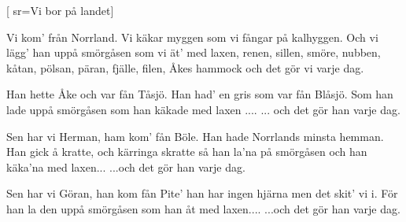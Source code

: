 
[
	sr={Vi bor på landet}]
  
\beginverse*
Vi kom' från Norrland. Vi käkar myggen
som vi fångar på kalhyggen.
Och vi lägg' han uppå smörgåsen
som vi ät' med laxen,
renen,
sillen,
smöre,
nubben,
kåtan,
pölsan,
päran,
fjälle,
filen,
Åkes hammock
och det gör vi varje dag. 
\endverse

\beginverse*
Han hette Åke och var fån Tåsjö.
Han had' en gris som var fån Blåsjö.
Som han lade uppå smörgåsen
som han käkade med laxen ....
... och det gör han varje dag. 
\endverse

\beginverse*
Sen har vi Herman, ham kom' fån Böle.
Han hade Norrlands minsta hemman.
Han gick å kratte, och kärringa skratte
så han la'na på smörgåsen
och han käka'na med laxen...
...och det gör han varje dag. 
\endverse

\beginverse*
Sen har vi Göran, han kom fån Pite'
han har ingen hjärna men det skit' vi i.
För han la den uppå smörgåsen
som han åt med laxen....
...och det gör han varje dag. 
\endverse
\endsong
